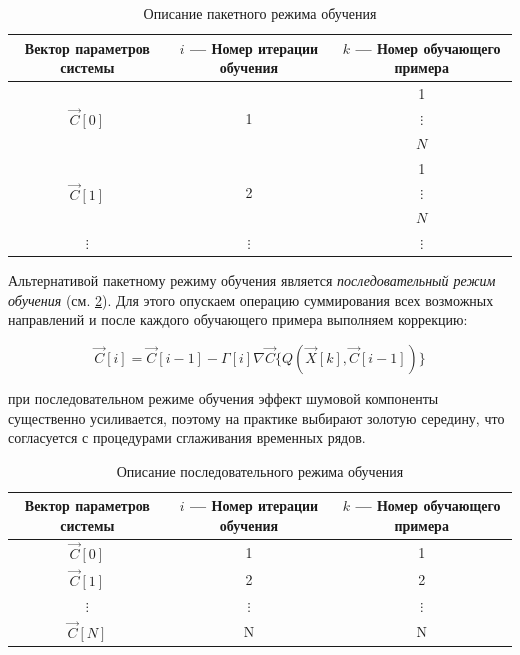 \documentclass[a4paper]{article}
\numberwithin{equation}{subsection}
\begin{document}
\begin{table}[htbp]
    \centering
    \caption{Описание пакетного режима обучения}
    \label{table:packet_training}
    \begin{tabular}{c | c | c}
        Вектор параметров системы     & $i$ --- Номер итерации обучения & $k$ --- Номер обучающего примера \\\hline
        \multirow{3}{*}{$\vec{C}[0]$} & \multirow{3}{*}{1}  & 1 \\\cline{3-3}
                                      &                     & $\vdots$\\\cline{3-3}
                                      &                     & $N$ \\\hline
        \multirow{3}{*}{$\vec{C}[1]$} & \multirow{3}{*}{2}  & 1 \\\cline{3-3}
                                      &                     & $\vdots$\\\cline{3-3}
                                      &                     & $N$ \\\hline
        $\vdots$                      & $\vdots$            & $\vdots$ \\\hline
    \end{tabular}
\end{table}

Альтернативой пакетному режиму обучения является \textit{последовательный режим обучения}
(см. \ref{table:seq_training}).
Для этого опускаем операцию суммирования всех возможных направлений и после каждого
обучающего примера выполняем коррекцию:

\begin{equation}
    \vec{C}[i] = \vec{C}[i-1] - \Gamma[i] \nabla\vec{C} \{ Q(\vec{X}[k], \vec{C}[i-1]) \}
\end{equation}

при последовательном режиме обучения эффект шумовой компоненты существенно 
усиливается, поэтому на практике выбирают \glqq золотую середину\grqq, что
согласуется с процедурами сглаживания временных рядов.

\begin{table}[htbp]
    \centering
    \caption{Описание последовательного режима обучения}
    \label{table:seq_training}
    \begin{tabular}{c | c | c}
        Вектор параметров системы     & $i$ --- Номер итерации обучения & $k$ --- Номер обучающего примера \\\hline
        $\vec{C}[0]$                  & 1                   & 1 \\\hline
        $\vec{C}[1]$                  & 2                   & 2 \\\hline
        $\vdots$                      & $\vdots$            & $\vdots$\\\hline
        $\vec{C}[N]$                  & N                   & N \\\hline
    \end{tabular}
\end{table}
\end{document}
